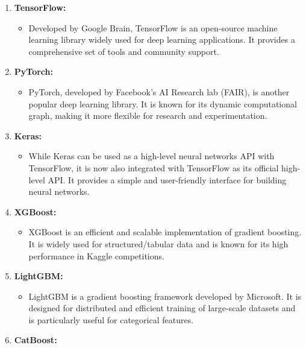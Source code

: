\documentclass[
]{book}
\providecommand{\tightlist}{%
  \setlength{\itemsep}{0pt}\setlength{\parskip}{0pt}}
\begin{document}
\begin{enumerate}
\def\labelenumi{\arabic{enumi}.}
\tightlist
\item
  \textbf{TensorFlow:}

  \begin{itemize}
  \tightlist
  \item
    Developed by Google Brain, TensorFlow is an open-source machine learning library widely used for deep learning applications. It provides a comprehensive set of tools and community support.
  \end{itemize}
\item
  \textbf{PyTorch:}

  \begin{itemize}
  \tightlist
  \item
    PyTorch, developed by Facebook's AI Research lab (FAIR), is another popular deep learning library. It is known for its dynamic computational graph, making it more flexible for research and experimentation.
  \end{itemize}
\item
  \textbf{Keras:}

  \begin{itemize}
  \tightlist
  \item
    While Keras can be used as a high-level neural networks API with TensorFlow, it is now also integrated with TensorFlow as its official high-level API. It provides a simple and user-friendly interface for building neural networks.
  \end{itemize}
\item
  \textbf{XGBoost:}

  \begin{itemize}
  \tightlist
  \item
    XGBoost is an efficient and scalable implementation of gradient boosting. It is widely used for structured/tabular data and is known for its high performance in Kaggle competitions.
  \end{itemize}
\item
  \textbf{LightGBM:}

  \begin{itemize}
  \tightlist
  \item
    LightGBM is a gradient boosting framework developed by Microsoft. It is designed for distributed and efficient training of large-scale datasets and is particularly useful for categorical features.
  \end{itemize}
\item
  \textbf{CatBoost:}


\end{enumerate}
\end{document}
